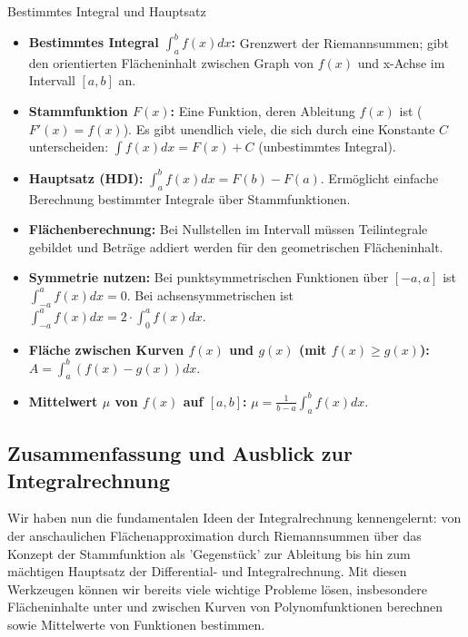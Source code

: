 \begin{kurzknappumgebung}{Bestimmtes Integral und Hauptsatz}
\begin{itemize}
    \item \textbf{Bestimmtes Integral $\int_a^b f(x)dx$:} Grenzwert der Riemannsummen; gibt den orientierten Flächeninhalt zwischen Graph von $f(x)$ und x-Achse im Intervall $[a,b]$ an.
    \item \textbf{Stammfunktion $F(x)$:} Eine Funktion, deren Ableitung $f(x)$ ist ($F'(x)=f(x)$). Es gibt unendlich viele, die sich durch eine Konstante $C$ unterscheiden: $\int f(x)dx = F(x)+C$ (unbestimmtes Integral).
    \item \textbf{Hauptsatz (HDI):} $\int_a^b f(x)dx = F(b) - F(a)$. Ermöglicht einfache Berechnung bestimmter Integrale über Stammfunktionen.
    \item \textbf{Flächenberechnung:} Bei Nullstellen im Intervall müssen Teilintegrale gebildet und Beträge addiert werden für den geometrischen Flächeninhalt.
    \item \textbf{Symmetrie nutzen:} Bei punktsymmetrischen Funktionen über $[-a,a]$ ist $\int_{-a}^a f(x)dx = 0$. Bei achsensymmetrischen ist $\int_{-a}^a f(x)dx = 2 \cdot \int_0^a f(x)dx$.
    \item \textbf{Fläche zwischen Kurven $f(x)$ und $g(x)$ (mit $f(x) \ge g(x)$):} $A = \int_a^b (f(x)-g(x))dx$.
    \item \textbf{Mittelwert $\mu$ von $f(x)$ auf $[a,b]$:} $\mu = \frac{1}{b-a}\int_a^b f(x)dx$.
\end{itemize}
\end{kurzknappumgebung}


\subsection{Zusammenfassung und Ausblick zur Integralrechnung}
\label{subsec:zusammenfassung_ausblick_integral}

Wir haben nun die fundamentalen Ideen der Integralrechnung kennengelernt: von der anschaulichen Flächenapproximation durch Riemannsummen über das Konzept der Stammfunktion als 'Gegenstück' zur Ableitung bis hin zum mächtigen Hauptsatz der Differential- und Integralrechnung. Mit diesen Werkzeugen können wir bereits viele wichtige Probleme lösen, insbesondere Flächeninhalte unter und zwischen Kurven von Polynomfunktionen berechnen sowie Mittelwerte von Funktionen bestimmen.


